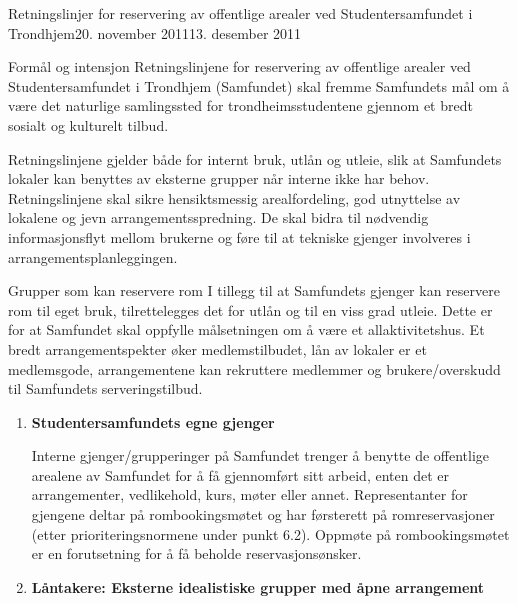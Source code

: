 \documentclass[fsbok.tex]{subfiles}
\begin{document}
\begin{instruks}{Retningslinjer for reservering av offentlige arealer
    ved Studentersamfundet i Trondhjem}{20. november 2011}{13. desember 2011}

    \begin{instruksledd}{Formål og intensjon}
        Retningslinjene for reservering av offentlige arealer ved Studentersamfundet i Trondhjem
        (Samfundet) skal fremme
        Samfundets mål om å være det naturlige samlingssted for trondheimsstudentene gjennom et
        bredt sosialt og kulturelt tilbud.


        Retningslinjene gjelder både for internt bruk, utlån og utleie, slik at Samfundets lokaler
        kan benyttes av eksterne
        grupper når interne ikke har behov. Retningslinjene skal sikre hensiktsmessig
        arealfordeling, god utnyttelse av
        lokalene og jevn arrangementsspredning. De skal bidra til nødvendig informasjonsflyt
        mellom brukerne og føre til at
        tekniske gjenger involveres i arrangementsplanleggingen.
    \end{instruksledd}

    \begin{instruksledd}{Grupper som kan reservere rom}
        I tillegg til at Samfundets gjenger kan reservere rom til eget bruk,
        tilrettelegges det for utlån og til en viss grad utleie.
        Dette er for at Samfundet skal oppfylle målsetningen om å være et
        allaktivitetshus. Et bredt arrangementspekter øker
        medlemstilbudet, lån av lokaler er et medlemsgode, arrangementene kan rekruttere
        medlemmer og brukere/overskudd
        til Samfundets serveringstilbud.

        \begin{enumerate}
            \item \textbf{Studentersamfundets egne gjenger}

                Interne gjenger/grupperinger på Samfundet trenger å benytte de offentlige
                arealene av
                Samfundet for å få gjennomført sitt arbeid, enten det er arrangementer,
                vedlikehold, kurs,
                møter eller annet. Representanter for gjengene deltar på rombookingsmøtet
                og har førsterett
                på romreservasjoner (etter prioriteringsnormene under punkt 6.2). Oppmøte
                på
                rombookingsmøtet er en forutsetning for å få beholde reservasjonsønsker.

            \item \textbf{ Låntakere: Eksterne idealistiske grupper med åpne arrangement}


\end{enumerate}
\end{instruksledd}
\end{instruks}
\end{document}
